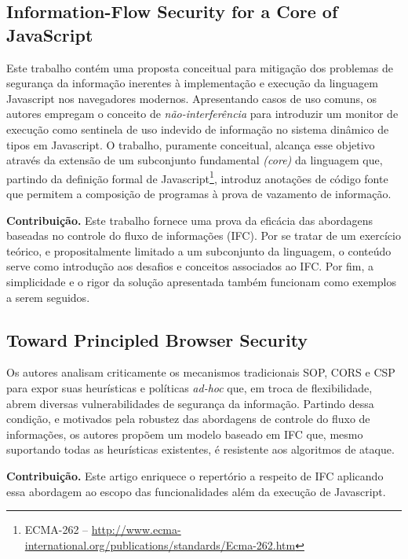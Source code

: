 \subsection{Information-Flow Security for a Core of JavaScript \cite{Hedin2012}}
Este trabalho contém uma proposta conceitual para mitigação dos problemas de segurança da informação inerentes à implementação e execução da linguagem Javascript nos navegadores modernos. Apresentando casos de uso comuns, os autores empregam o conceito de \textit{não-interferência} para introduzir um monitor de execução como sentinela de uso indevido de informação no sistema dinâmico de tipos em Javascript. O trabalho, puramente conceitual, alcança esse objetivo através da extensão de um subconjunto fundamental \textit{(core)} da linguagem que, partindo da definição formal de Javascript\footnote{ECMA-262 -- \url{http://www.ecma-international.org/publications/standards/Ecma-262.htm}}, introduz anotações de código fonte que permitem a composição de programas à prova de vazamento de informação.

\textbf{Contribuição.} Este trabalho fornece uma prova da eficácia das abordagens baseadas no controle do fluxo de informações (IFC). Por se tratar de um exercício teórico, e propositalmente limitado a um subconjunto da linguagem, o conteúdo serve como introdução aos desafios e conceitos associados ao IFC. Por fim, a simplicidade e o rigor da solução apresentada também funcionam como exemplos a serem seguidos.


\subsection{Toward Principled Browser Security \cite{Yang2013}}
Os autores analisam criticamente os mecanismos tradicionais SOP, CORS e CSP para expor suas heurísticas e políticas \textit{ad-hoc} que, em troca de flexibilidade, abrem diversas vulnerabilidades de segurança da informação. Partindo dessa condição, e motivados pela robustez das abordagens de controle do fluxo de informações, os autores propõem um modelo baseado em IFC que, mesmo suportando todas as heurísticas existentes, é resistente aos algoritmos de ataque.

\textbf{Contribuição.} Este artigo enriquece o repertório a respeito de IFC aplicando essa abordagem ao escopo das funcionalidades além da execução de Javascript.


